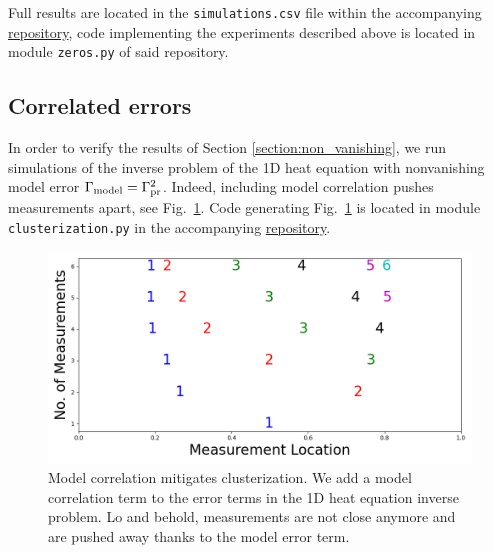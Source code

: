 \documentclass[ba]{imsart}
\theoremstyle{plain}
\theoremstyle{definition}
\theoremstyle{remark}
\begin{document}
Full results are located in the \texttt{simulations.csv} file within
the accompanying \href{https://github.com/yairdaon/OED}{repository},
code implementing the experiments described above is located in module
\texttt{zeros.py} of said repository.


\subsection{Correlated errors}\label{subsec:corr_errors_sims}
In order to verify the results of Section \ref{section:non_vanishing},
we run simulations of the inverse problem of the 1D heat equation with
nonvanishing model error \(\Gamma_{\textup{model}} = \Gamma_{\textup{pr}}^2 \). Indeed, including
model correlation pushes measurements apart, see
Fig.~\ref{fig:corr_errors}. Code generating Fig.~\ref{fig:corr_errors}
is located in module \texttt{clusterization.py} in the accompanying
\href{https://github.com/yairdaon/OED}{repository}.

\begin{figure}
    \centering
    \includegraphics[height=0.5\textwidth]{figs/dst_modelError4.png}
    \caption{Model correlation mitigates clusterization. We add a
      model correlation term to the error terms in the 1D heat
      equation inverse problem. Lo and behold, measurements are not
      close anymore and are pushed away thanks to the model error
      term.}
  \label{fig:corr_errors}
\end{figure}



 
\end{document}
